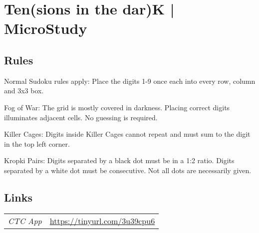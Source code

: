 \section[Ten(sions in the dar)K | MicroStudy {[\emph{Sudoku, Fog Of War, Killer, Kropki Pairs}]}]{Ten(sions in the dar)K | {\normalfont MicroStudy}}
\label{sec:08-ten-sions-in-the-dar-k-microstudy}

\subsection*{Rules}
\begin{markdown}
Normal Sudoku rules apply: Place the digits 1-9 once each into every row, column and 3x3 box.



Fog of War: The grid is mostly covered in darkness. Placing correct digits illuminates adjacent cells. No guessing is required.



Killer Cages: Digits inside Killer Cages cannot repeat and must sum to the digit in the top left corner.



Kropki Pairs: Digits separated by a black dot must be in a 1:2 ratio. Digits separated by a white dot must be consecutive. Not all dots are necessarily given.
\end{markdown}
\subsection*{Links}
\begin{tabularx}{\textwidth}{l X}
\emph{CTC App} & \url{https://tinyurl.com/3u39cpu6} \\
\end{tabularx}
\pagebreak
